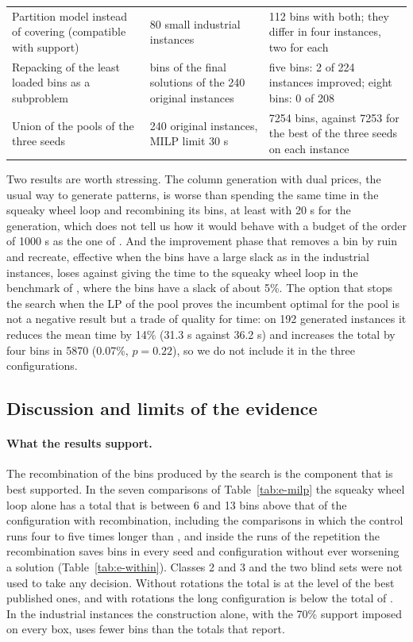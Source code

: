 \begin{table}[t]
\begin{tabular}{@{}p{3.7cm}p{4.0cm}p{7.2cm}@{}}
Partition model instead of covering (compatible with support) & 80 small industrial instances & 112 bins with both; they differ in four instances, two for each\\
Repacking of the least loaded bins as a subproblem & bins of the final solutions of the 240 original instances & five bins: 2 of 224 instances improved; eight bins: 0 of 208\\
Union of the pools of the three seeds & 240 original instances, MILP limit 30 s & 7254 bins, against 7253 for the best of the three seeds on each instance\\
\bottomrule
\end{tabular}
\end{table}

Two results are worth stressing. The column generation with dual prices, the usual way to generate patterns, is worse than spending the same time in the squeaky wheel loop and recombining its bins, at least with 20 s for the
generation, which does not tell us how it would behave with a budget of the order of 1000 s as the one of \citet{Mahvash2018}. And the improvement phase that removes a bin by ruin and recreate, effective when the bins have a large slack as in the industrial instances,
loses against giving the time to the squeaky wheel loop in the benchmark of \citet{Martello2000}, where the bins have a slack of about 5\%.
The option that stops the search when the LP of the pool proves the incumbent optimal for the pool is not a negative result but a trade of quality for time: on 192 generated instances it reduces the mean time by 14\% (31.3 s against 36.2 s) and
increases the total by four bins in 5870 (0.07\%, $p=0.22$), so we do not include it in the three configurations.

\subsection{Discussion and limits of the evidence}
\label{sec:e-discussion}

\paragraph{What the results support.}
The recombination of the bins produced by the search is the component that is best supported. In the seven comparisons of Table~\ref{tab:e-milp} the squeaky wheel loop alone has a total that is between 6 and 13 bins above that of the
configuration with recombination, including the comparisons in which the control runs four to five times longer than \cfgfast{}, and inside the runs of the repetition the recombination saves bins in every seed and configuration without ever worsening a solution (Table~\ref{tab:e-within}).
Classes 2 and 3 and the two blind sets were not used to take any decision. Without rotations the total is at the level of the best published ones, and with rotations the long configuration is below the total of \citet{Mahvash2018}.
In the industrial instances the construction alone, with the 70\% support imposed on every box, uses fewer bins than the totals that \citet{Elhedhli2019} report.

